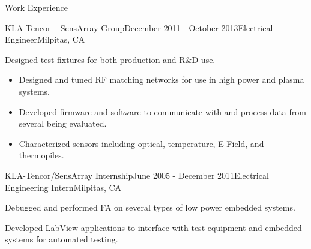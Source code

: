 \documentclass{resume} %
\begin{document}
\begin{rSection}{Work Experience}
\begin{rSubsection}{KLA-Tencor -- SensArray Group}{December 2011 - October 2013}{Electrical Engineer}{Milpitas, CA}
\item Designed test fixtures for both production and R\&D use.
\begin{itemize}
\itemsep -0.5em \vspace{-0.5em}
\renewcommand{\labelitemi}{-}
\item Designed and tuned RF matching networks for use in high power and plasma systems.
\item Developed firmware and software to communicate with and process data from several being evaluated.
\item Characterized sensors including optical, temperature, E-Field, and thermopiles.
\end{itemize}
\end{rSubsection}

\pagebreak[2]
\begin{rSubsection}{KLA-Tencor/SensArray Internship}{June 2005 - December 2011}{Electrical Engineering Intern}{Milpitas, CA}
\item Debugged and performed FA on several types of low power embedded systems. 
\item Developed LabView applications to interface with test equipment and embedded systems for automated testing.
\end{rSubsection}
\end{rSection}
\end{document}
